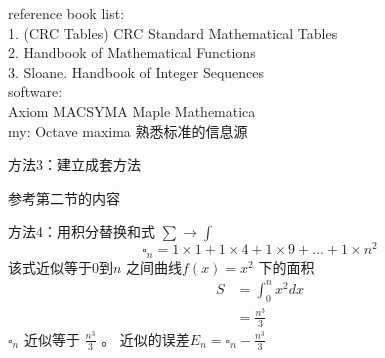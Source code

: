\documentclass[mode=geye]{elegantnote}
\begin{document}
reference book list:\\
1. (CRC Tables) CRC Standard Mathematical Tables\\
2. Handbook of Mathematical Functions\\
3. Sloane. Handbook of Integer Sequences\\
software: \\
Axiom MACSYMA Maple Mathematica\\
my: Octave maxima
熟悉标准的信息源

方法3：建立成套方法

参考第二节的内容

方法4：用积分替换和式 $ \sum \rightarrow \int $ 
\begin{equation*}
    \square_n = 1\times1+1\times4+1\times9 +\dots+1\times n^2
\end{equation*}
该式近似等于0到$ n $ 之间曲线$ f(x)=x^2 $ 下的面积
\begin{align*}
    S &= \int_{0}^{n}x^2 dx \\
    &=\frac{n^3}{3}
\end{align*}
$ \square_n $ 近似等于 $ \frac{n^3}{3} $ 。
近似的误差$ E_n = \square_n - \frac{n^3}{3} $ 
\end{document}
